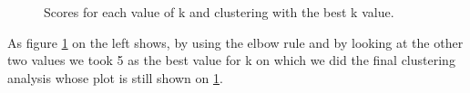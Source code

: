 \begin{figure}[H]
    \centering
    \caption{Scores for each value of k and clustering with the best k value.}
    \label{fig:timeseries_clusters}
\end{figure}
As figure \ref{fig:timeseries_clusters} on the left shows, by using the elbow rule and by looking at the other two values we took 5 as the best value for k on which we did the final clustering analysis whose plot is still shown on \ref{fig:timeseries_clusters}.
\vspace{3mm}

